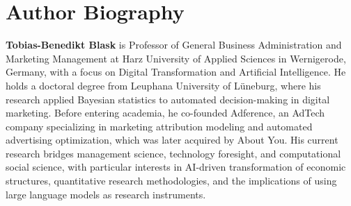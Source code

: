 \documentclass[12pt]{article}
\begin{document}
\section*{Author Biography}

\textbf{Tobias-Benedikt Blask} is Professor of General Business Administration and Marketing Management at Harz University of Applied Sciences in Wernigerode, Germany, with a focus on Digital Transformation and Artificial Intelligence. He holds a doctoral degree from Leuphana University of L\"uneburg, where his research applied Bayesian statistics to automated decision-making in digital marketing. Before entering academia, he co-founded Adference, an AdTech company specializing in marketing attribution modeling and automated advertising optimization, which was later acquired by About You. His current research bridges management science, technology foresight, and computational social science, with particular interests in AI-driven transformation of economic structures, quantitative research methodologies, and the implications of using large language models as research instruments.
\end{document}
